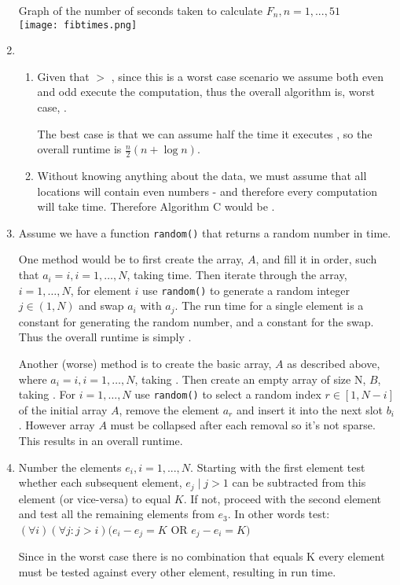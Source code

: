 \documentclass[12pt]{chmullighw}
\begin{document}
\begin{enumerate}
Graph of the number of seconds taken to calculate $F_n, n=1,...,51$ \\
\texttt{[image: fibtimes.png]}


\item
    \begin{enumerate}
    \item  Given that  $>$ , since this is a worst case scenario
we assume both even and odd execute the  computation, thus the overall
algorithm is, worst case, .

    The best case is that we can assume half the time it executes ,
    so the overall runtime is $\frac{n}{2}(n + \log n)$.
    \item Without knowing anything about the data, we must assume that all locations
    will contain even numbers - and therefore every computation will take  time. Therefore
    Algorithm C would be .
    \end{enumerate}

\item Assume we have a function \texttt{random()} that returns a random number
in  time.

One method would be to first create the array, $A$, and fill it in order, such that
$a_i = i, i = 1,\ldots,N$, taking  time.
Then iterate through the array, $i = 1,\ldots,N$, for element
$i$ use \texttt{random()} to generate a random integer $j \in (1, N)$ and swap
$a_i$ with $a_j$. The run time for a single element is a constant for generating
the random number, and a constant for the swap. Thus the overall runtime is
simply .

Another (worse) method is to create the basic array, $A$ as described above, where
$a_i = i, i=1,\ldots,N$, taking . Then create an empty array of size N,
$B$, taking . For $i = 1,\ldots,N$ use \texttt{random()} to select a
random index $r \in [1, N-i]$ of the initial array $A$, remove the element $a_r$
and insert it into the next slot $b_i$. However array $A$ must be collapsed after
each removal so it's not sparse. This results in an overall  runtime.


\item Number the elements $e_i, i=1,...,N$. Starting with the first element test
whether each subsequent element, $e_j \mid j > 1$ can be subtracted from this element (or
vice-versa) to equal $K$. If not, proceed with the second element and test all
the remaining elements from $e_3$. In other words test:\\
$(\forall i)(\forall j : j > i)(e_i - e_j = K$ OR $e_j - e_i = K)$

Since in the worst case there is no combination that equals K every element must
be tested against every other element, resulting in  run time.


\end{enumerate} %
\end{document}

